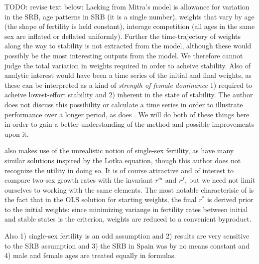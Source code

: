 TODO: revise text below:
Lacking from Mitra's model is allowance for variation in the SRB, age patterns
in SRB (it is a single number), weights that vary by age (the shape of
fertility is held constant), interage competition (all ages in the same sex are
inflated or deflated uniformly). Further the time-trajectory of weights along
the way to stability is not extracted from the model, although these would
possibly be the most interesting outputs from the model. We therefore cannot
judge the total variation in weights required in order to acheive stability.
Also of analytic interest would have been a time series of the initial and final
weights, as these can be interpreted as a kind of \textit{strength of female
dominance} 1) required to acheive lowest-effort stability and 2) inherent in
the state of stability. The author does not discuss this possibility or
calculate a time series in order to illustrate performance over a longer 
period, as does \citet{gupta1973, gupta1978general}. We will do both of these
things here in order to gain a better understanding of the method and possible
improvements upon it.

\citet{mitra1978derivation} also makes use of the unrealistic
notion of single-sex fertility, as have many similar solutions inspired by the
Lotka equation, though this author does not recognize the utility in doing so.
It is of course attractive and of interest to compare two-sex growth rates with the invariant $r^m$ and $r^f$, but
we need not limit ourselves to working with the same elements. The most notable characterisic of
\citep{mitra1978derivation} is the fact that in the OLS solution for starting
weights, the final $r^\ast$ is derived prior to the initial weights: since
minimizing variange in fertility rates between initial and stable states is the
criterion, weights are reduced to a convenient byproduct.

Also 1) single-sex fertility is an odd assumption and 2) results are very
sensitive to the SRB assumption and 3) the SRB in Spain was by no means constant
and 4) male and female ages are treated equally in formulas.





